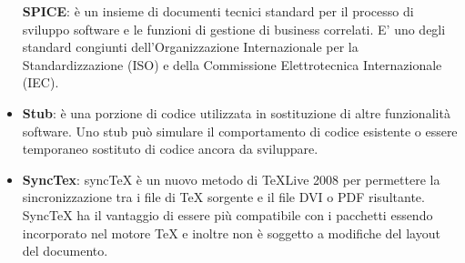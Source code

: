 \begin{itemize}
	\textbf{SPICE}: è un insieme di documenti tecnici standard per il processo di sviluppo software e le funzioni di gestione di business correlati. E' uno degli standard congiunti dell'Organizzazione Internazionale per la Standardizzazione (ISO) e della Commissione Elettrotecnica Internazionale (IEC).
	\item
	\textbf{Stub}:  è una porzione di codice utilizzata in sostituzione di altre funzionalità software. Uno stub può simulare il comportamento di codice esistente o essere temporaneo sostituto di codice ancora da sviluppare. 
	\item
	\textbf{SyncTex}: syncTeX è un nuovo metodo di TeXLive 2008 per permettere la sincronizzazione tra i file di TeX sorgente e il file DVI o PDF risultante. SyncTeX ha il vantaggio di essere più compatibile con i pacchetti essendo incorporato nel motore TeX e inoltre non è soggetto a modifiche del layout del documento.
\end{itemize}